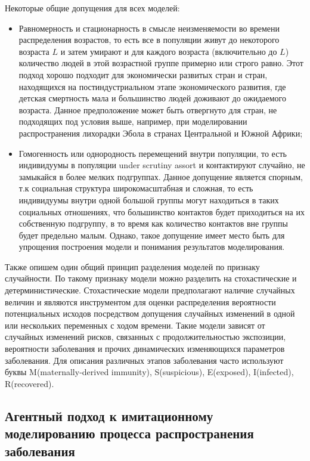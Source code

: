Некоторые общие допущения для всех моделей:
\begin{itemize}
	\item Равномерность и стационарность в смысле неизменяемости во времени  распределения возрастов, то есть все в популяции живут до некоторого возраста $\mathit{L}$ и затем умирают и для каждого возраста (включительно до $\mathit{L}$) количество людей в этой возрастной группе примерно или строго равно. Этот подход хорошо подходит для экономически развитых стран и стран, находящихся на постиндустриальном этапе экономического развития, где детская смертность мала и большинство людей доживают до ожидаемого возраста. Данное предположение может быть отвергнуто для стран, не подходящих под условия выше, например, при моделировании распространения лихорадки Эбола в странах Центральной и Южной Африки;
	\item Гомогенность или однородность перемещений внутри популяции, то есть индивидуумы  в популяции under scrutiny assort %
	и контактируют случайно, не замыкайся в более мелких подгруппах. Данное допущение является спорным, т.к социальная структура широкомасштабная и сложная, то есть индивидуумы внутри одной большой группы могут находиться в таких социальных отношениях, что большинство контактов будет приходиться на их собственную подгруппу, в то время как количество контактов вне группы будет предельно малым. Однако, такое допущение имеет место быть для упрощения построения модели   и понимания результатов моделирования.
\end{itemize}


Также опишем один общий принцип разделения моделей по признаку случайности. По такому признаку  модели можно разделить на стохастические и детерминистические. Стохастические модели предполагают наличие случайных величин  и являются инструментом для оценки распределения вероятности потенциальных исходов  посредством допущения случайных изменений в одной или нескольких переменных с ходом времени. Такие модели зависят от случайных изменений рисков, связанных с продолжительностью экспозиции, вероятности заболевания и прочих динамических изменяющихся параметров заболевания. Для описания различных этапов заболевания часто используют буквы M(maternally-derived immunity), S(suspicious), E(exposed), I(infected), R(recovered).

\subsection{Агентный подход к имитационному моделированию процесса распространения заболевания}

